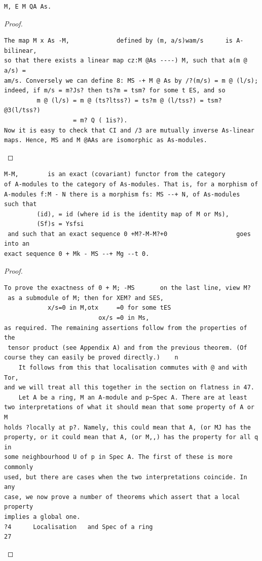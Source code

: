 \begin{theorem}\label{mcrt-auto-theorem-4-4}\uses{}
\begin{verbatim}
M, E M QA As.
\end{verbatim}
\end{theorem}
\begin{proof}
\begin{verbatim}
The map M x As -M,             defined by (m, a/s)wam/s      is A-bilinear,
so that there exists a linear map cz:M @As ----) M, such that a(m @ a/s) =
am/s. Conversely we can define 8: MS -+ M @ As by /?(m/s) = m @ (l/s);
indeed, if m/s = m?Js? then ts?m = tsm? for some t ES, and so
         m @ (l/s) = m @ (ts?ltss?) = ts?m @ (l/tss?) = tsm? @3(l/tss?)
                   = m? Q ( 1is?).
Now it is easy to check that CI and /3 are mutually inverse As-linear
maps. Hence, MS and M @AAs are isomorphic as As-modules.
\end{verbatim}
\end{proof}


\begin{theorem}\label{mcrt-auto-theorem-4-5}\uses{}
\begin{verbatim}
M-M,        is an exact (covariant) functor from the category
of A-modules to the category of As-modules. That is, for a morphism of
A-modules f:M - N there is a morphism fs: MS --+ N, of As-modules
such that
         (id), = id (where id is the identity map of M or Ms),
         (Sf)s = Ysfsi
 and such that an exact sequence 0 +M?-M-M?+0                   goes into an
exact sequence 0 + Mk - MS --+ Mg --t 0.
\end{verbatim}
\end{theorem}
\begin{proof}
\begin{verbatim}
To prove the exactness of 0 + M; -MS       on the last line, view M?
 as a submodule of M; then for XEM? and SES,
            x/s=0 in M,otx     =0 for some tES
                          ox/s =0 in Ms,
as required. The remaining assertions follow from the properties of the
 tensor product (see Appendix A) and from the previous theorem. (Of
course they can easily be proved directly.)    n
    It follows from this that localisation commutes with @ and with Tor,
and we will treat all this together in the section on flatness in 47.
    Let A be a ring, M an A-module and p~Spec A. There are at least
two interpretations of what it should mean that some property of A or M
holds ?locally at p?. Namely, this could mean that A, (or MJ has the
property, or it could mean that A, (or M,,) has the property for all q in
some neighbourhood U of p in Spec A. The first of these is more commonly
used, but there are cases when the two interpretations coincide. In any
case, we now prove a number of theorems which assert that a local property
implies a global one.
?4      Localisation   and Spec of a ring                                27
\end{verbatim}
\end{proof}


